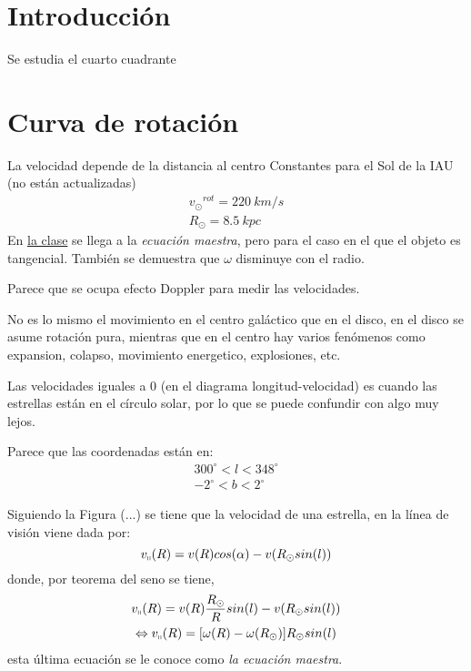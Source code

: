 \documentclass[letterpaper,oneside]{article}
\begin{document}
	
\templatePortrait

\templatePagecfg


\templateIndex

\templateFinalcfg


\section{Introducción}
Se estudia el cuarto cuadrante

\section{Curva de rotación}
La velocidad depende de la distancia al centro
Constantes para el Sol de la IAU (no están actualizadas)
\begin{gather*}
{v_{\odot}}^{rot}=220 \ km/s\\
R_{\odot} = 8.5 \ kpc
\end{gather*}
En \href{https://www.youtube.com/watch?v=Ijj2VhVSFsg}{la clase} se llega a la \textit{ecuación maestra}, pero para el caso en el que el objeto es tangencial. También se demuestra que $\omega$ disminuye con el radio.

Parece que se ocupa efecto Doppler para medir las velocidades.

No es lo mismo el movimiento en el centro galáctico que en el disco, en el disco se asume rotación pura, mientras que en el centro hay varios fenómenos como expansion, colapso, movimiento energetico, explosiones, etc.

Las velocidades iguales a 0 (en el diagrama longitud-velocidad) es cuando las estrellas están en el círculo solar, por lo que se puede confundir con algo muy lejos.

Parece que las coordenadas están en:
\begin{gather*}
300 ^{\circ}<l<348^{\circ}\\
-2^{\circ}<b<2^{\circ}
\end{gather*}

Siguiendo la Figura (...) se tiene que la velocidad de una estrella, en la línea de visión viene dada por:
\begin{equation*}
v_{\shortparallel}(R)=v(R)cos(\alpha)-v(R_{\odot}sin(l))
\end{equation*}
donde, por teorema del seno se tiene,
\begin{gather*}
v_{\shortparallel}(R)=v(R)\frac{R_{\odot}}{R}sin(l)-v(R_{\odot}sin(l))\\
\Leftrightarrow v_{\shortparallel}(R)=[\omega(R)-\omega(R_{\odot})]R_{\odot}sin(l)
\end{gather*}
esta última ecuación se le conoce como \textit{la ecuación maestra}.
\end{document}

